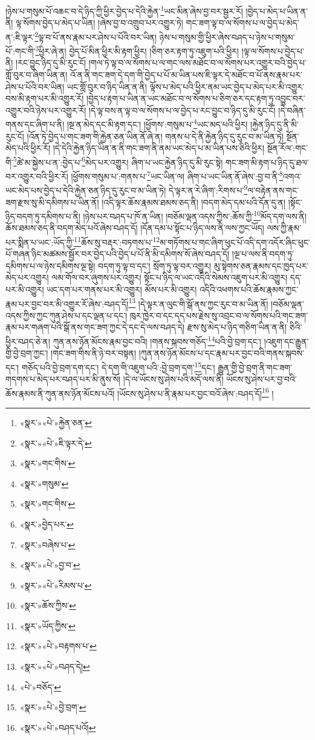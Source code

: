 །ཉེས་པ་གསུམ་པོ་འཆང་བ་དེ་ཉིད་ཀྱི་ཕྱིར་བྱེད་པ་དེའི་རྐྱེན་\footnote{«སྣར་»«པེ་»རྐྱེན་ཅན་}ཡང་མིན་ཞེས་བྱ་བར་སྦྱར་རོ། །བྱེད་པ་མེད་པ་ཡིན་ན་ནི། ལྟ་སོགས་བྱེད་པ་མེད་པ་ཡིན། །ཞེས་བྱ་བ་འགྲུབ་པར་འགྱུར་ཏེ། གང་ཟག་ལྟ་བ་ལ་སོགས་པ་ལ་བྱེད་པ་མེད་ན་:ཇི་ལྟར་\footnote{«སྣར་»«པེ་»ཇི་ལྟར་དེ་}ལྟ་བ་པོ་ནས་རྣམ་པར་ཤེས་པ་པོའི་བར་ཡིན། ཉེས་པ་གསུམ་གྱི་ཕྱིར་ཞེས་བཤད་པ་ཉེས་པ་གསུམ་པོ་:གང་གི་\footnote{«སྣར་»གང་གིས་}ཕྱིར་ཞེ་ན། བྱེད་པོ་མིན་ཕྱིར་མི་རྟག་ཕྱིར། །ཅིག་ཅར་རྟག་ཏུ་འཇུག་པའི་ཕྱིར། །ལྟ་ལ་སོགས་པ་བྱེད་པ་ནི། །རང་བྱུང་ཉིད་དུ་མི་རུང་ངོ། །གལ་ཏེ་ལྟ་བ་ལ་སོགས་པ་ལ་གང་ལས་མཐོང་བ་ལ་སོགས་པར་འགྱུར་བའི་བྱེད་པ་གློ་བུར་བ་ཞིག་ཡིན་ན། འོ་ན་ནི་གང་ཟག་དེ་དག་གི་བྱེད་པ་པོ་མ་ཡིན་པས་ཇི་ལྟར་དེ་མཐོང་བ་པོ་ནས་རྣམ་པར་ཤེས་པ་པོའི་བར་ཡིན། ཡང་གློ་བུར་བ་ཉིད་ཡིན་ན་ནི། ལྟོས་པ་མེད་པའི་ཕྱིར་ནམ་ཡང་བྱེད་པ་མེད་པར་མི་འགྱུར་བས་མི་རྟག་པར་མི་འགྱུར་རོ། །བྱེད་པ་རྟག་པ་ཡིན་ན་ཡང་མཐོང་བ་ལ་སོགས་པ་ཅིག་ཅར་དང་རྟག་ཏུ་འབྱུང་བར་འགྱུར་བའི་ཉེས་པར་འགྱུར་རོ། །དེ་ལྟ་བས་ན་ལྟ་བ་ལ་སོགས་པ་ལ་བྱེད་པ་རང་བྱུང་བ་ཉིད་དུ་མི་རུང་ངོ། །དེ་བཞིན་གནས་དང་ཞིག་པ་ནི། །སྔ་ན་མེད་དང་མི་རྟག་དང་། །ཕྱོགས་:གསུམ་པ་\footnote{«སྣར་»གསུམ་}ཡང་མད་པའི་ཕྱིར། །རྐྱེན་ཉིད་དུ་ནི་མི་རུང་ངོ། །འོན་ཏེ་བྱེད་པ་གང་ཟག་གི་རྐྱེན་ཅན་ཡིན་ནོ་ཞེ་ན། གནས་པ་དེ་ནི་རྐྱེན་ཉིད་དུ་རུང་བ་མ་ཡིན་ཏེ། སྔོན་མེད་པའི་ཕྱིར་རོ། །དེ་དེའི་རྐྱེན་ཉིད་ཡིན་ན་ནི་གང་ཟག་ནི་ནམ་ཡང་མེད་པ་མ་ཡིན་པས་ཅིའི་ཕྱིར། སྔོན་རོལ་:གང་གི་\footnote{«སྣར་»གང་གིས་}ཚེ་མ་སྐྱེས་པ་ན་:བྱེད་པ་\footnote{«སྣར་»བྱེད་པར་}མེད་པར་འགྱུར། ཞིག་པ་ཡང་རྐྱེན་ཉིད་དུ་མི་རུང་སྟེ། གང་ཟག་མི་རྟག་པ་ཉིད་དུ་ཐལ་བར་འགྱུར་བའི་ཕྱིར་རོ། །ཕྱོགས་གསུམ་པ་:གནས་པ་\footnote{«སྣར་»བཞེས་པ་}ཡང་ཡིན་ལ། ཞིག་པ་ཡང་ཡིན་ནོ་ཞེས་:བྱ་བ་ནི་\footnote{«སྣར་»«པེ་»བྱ་བ་}འགའ་ཡང་མེད་པས་བྱེད་པ་དེའི་རྐྱེན་ཅན་ཉིད་དུ་རུང་བ་མ་ཡིན་ཏེ། དེ་ལྟར་ན་རེ་ཞིག་:རིགས་པ་\footnote{«སྣར་»«པེ་»རིམས་པ་}ལ་བརྟེན་ནས་གང་ཟག་རྫས་སུ་མི་དམིགས་པ་ཡིན་ནོ། །འདི་ལྟར་ཆོས་རྣམས་ཐམས་ཅད་ནི། །བདག་མེད་དམ་པའི་དོན་དུ་ན། །སྟོང་ཉིད་བདག་ཏུ་དམིགས་པ་ནི། །ཉེས་པར་བཤད་པ་ཁོ་ན་ཡིན། །བཅོམ་ལྡན་འདས་ཀྱིས་:ཆོས་ཀྱི་\footnote{«སྣར་»ཆོས་ཀྱིས་}མོད་དག་ལས་ནི། ཆོས་ཐམས་ཅད་ནི་བདག་མེད་པའོ་ཞེས་བཤད་དོ། །དོན་དམ་པ་སྟོང་པ་ཉིད་ལས་ནི་ལས་ཀྱང་ཡོད། ལས་ཀྱི་རྣམ་པར་སྨིན་པ་ཡང་:ཡོད་ཀྱི་\footnote{«སྣར་»ཡོད་ཀྱིས་}ཆོས་སུ་བརྡར་:བཏགས་པ་\footnote{«སྣར་»«པེ་»བརྟགས་པ་}མ་གཏོགས་པ་གང་ཞིག་ཕུང་པོ་འདི་དག་འདོར་ཞིང་ཕུང་པོ་གཞན་ཉིང་མཚམས་སྦྱོར་བར་བྱེད་པའི་བྱེད་པ་པོ་ནི་མི་དམིགས་སོ་ཞེས་བཤད་དོ། །ལྔ་པ་ལས་ནི་བདག་ཏུ་དམིགས་པ་ལ་ཉེས་དམིགས་ལྔ་སྟེ། བདག་ཏུ་ལྟ་བ་དང་། སྲོག་ཏུ་ལྟ་བར་འགྱུར། མུ་སྟེགས་ཅན་རྣམས་དང་ཁྱད་པར་མེད་པར་འགྱུར། ལམ་གོལ་བར་ཞུགས་པར་འགྱུར། སྟོང་པ་ཉིད་ལ་ཡང་འདིའི་སེམས་འཇུག་པར་མི་འགྱུར། དད་པར་མི་འགྱུར། ཡང་དག་པར་གནས་པར་མི་འགྱུར། མོས་པར་མི་འགྱུར། འདིའི་འཕགས་པའི་ཆོས་རྣམས་ཀྱང་རྣམ་པར་བྱང་བར་མི་འགྱུར་རོ་ཞེས་:བཤད་དོ།\footnote{«སྣར་»«པེ་»བཤད་དེ།} །དེ་ལྟར་ན་ལུང་གི་སྒོ་ནས་ཀྱང་རུང་བ་མ་ཡིན་ནོ། །བཅོམ་ལྡན་འདས་ཀྱིས་ཀྱང་ཀུན་ཤེས་པ་དང་ལྡན་པ་དང་། ཁུར་ཁྱེར་བ་དང་དད་པས་རྗེས་སུ་འབྲང་བ་ལ་སོགས་པའི་གང་ཟག་རྣམ་པར་གཞག་པའི་སྒོ་ནས་གང་ཟག་ཀྱང་དེ་དང་དེ་ལས་བཤད་དེ། རྫས་སུ་མེད་པ་ཉིད་གཅིག་ཡིན་ན་ནི། ཅིའི་ཕྱིར་བཤད་ཅེ་ན། ཀུན་ནས་ཉོན་མོངས་རྣམ་བྱང་བའི། །གནས་སྐབས་གཅོད་\footnote{«པེ་»བཅོད་}པའི་བྱེ་བྲག་དང་། །འཇུག་དང་རྒྱུན་གྱི་བྱེ་བྲག་ཀྱང་། །གང་ཟག་གིས་ནི་ཉེ་བར་བསྟན། །ཀུན་ནས་ཉོན་མོངས་པ་དང་རྣམ་པར་བྱང་བའི་གནས་སྐབས་དང་། གཅོད་པའི་བྱེ་བྲག་དག་དང་། དེ་དག་གི་འཇུག་པའི་:བྱེ་བྲག་དག་\footnote{«སྣར་»«པེ་»བྱེ་བྲག་}དང་། རྒྱུན་གྱི་བྱེ་བྲག་ནི་གང་ཟག་གདགས་པ་མེད་པར་བཤད་པར་མི་ནུས་སོ། །དེ་ལ་ཡོངས་སུ་ཤེས་པའི་མདོ་ལས་ནི། ཡོངས་སུ་ཤེས་པར་བྱ་བའི་ཆོས་རྣམས་ནི་ཀུན་ནས་ཉོན་མོངས་པའོ། །ཡོངས་སུ་ཤེས་པ་ནི་རྣམ་པར་བྱང་བའོ་ཞེས་:བཤད་དོ།\footnote{«སྣར་»«པེ་»བཤད་པའོ།} །
